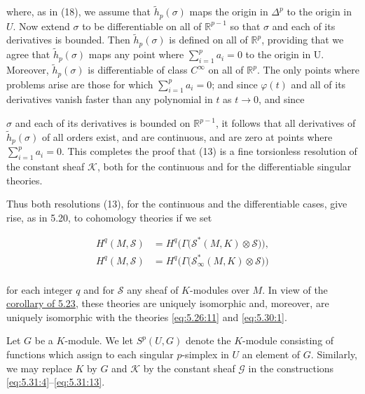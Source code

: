 where, as in (18), we assume that  $ \tilde{h}_{p}(\sigma) $ maps the origin in $\Delta^{p}$ to the origin in $U$. Now extend  $ \sigma $ to be differentiable on all of  $ \mathbb{R}^{p-1} $ so that  $ \sigma $ and each of its derivatives is bounded. Then  $ \tilde{h}_{p}(\sigma) $ is defined on all of  $ \mathbb{R}^{p} $, providing that we agree that  $ \tilde{h}_{p}(\sigma) $ maps any point where  $ \sum_{i=1}^{p} a_{i} = 0 $ to the origin in U. Moreover,  $ \tilde{h}_{p}(\sigma) $ is differentiable of class  $ C^{\infty} $ on all of  $ \mathbb{R}^{p} $. The only points where problems arise are those for which  $ \sum_{i=1}^{p} a_{i} = 0 $; and since  $ \varphi(t) $ and all of its derivatives vanish faster than any polynomial in  $ t $ as  $ t \to 0 $, and since

$\sigma$ and each of its derivatives is bounded on $\mathbb{R}^{p-1}$, it follows that all derivatives of $\tilde{h}_{p}(\sigma)$ of all orders exist, and are continuous, and are zero at points where $\sum_{i=1}^{p} a_{i}=0$. This completes the proof that (13) is a fine torsionless resolution of the constant sheaf $\mathcal{K}$, both for the continuous and for the differentiable singular theories.

Thus both resolutions (13), for the continuous and the differentiable cases, give rise, as in 5.20, to cohomology theories if we set

\begin{equation}
\tag{22}\label{eq:5.31:22}
\begin{aligned}{H^{q}(M,\mathcal{S})}&{{}=H^{q}\big(\Gamma\big(\mathcal{S}^{*}(M,K)\otimes\mathcal{S}\big)\big),}\\ {H^{q}(M,\mathcal{S})}&{{}=H^{q}\big(\Gamma\big(\mathcal{S}_{\infty}^{*}(M,K)\otimes\mathcal{S}\big)\big)}\\ \end{aligned}
\end{equation}

for each integer $q$ and for $\mathcal{S}$ any sheaf of $K$-modules over $M$. In view of the \hyperref[thm:5.23]{corollary of 5.23}, these theories are uniquely isomorphic and, moreover, are uniquely isomorphic with the theories \eqref{eq:5.26:11} and \eqref{eq:5.30:1}.

\label{thm:5.32}Let $G$ be a $K$-module. We let $S^p(U,G)$ denote the $K$-module consisting of functions which assign to each singular $p$-simplex in $U$ an element of $G$. Similarly, we may replace $K$ by $G$ and $\mathcal{K}$ by the constant sheaf $\mathcal{G}$ in the constructions \eqref{eq:5.31:4}–\eqref{eq:5.31:13}.

